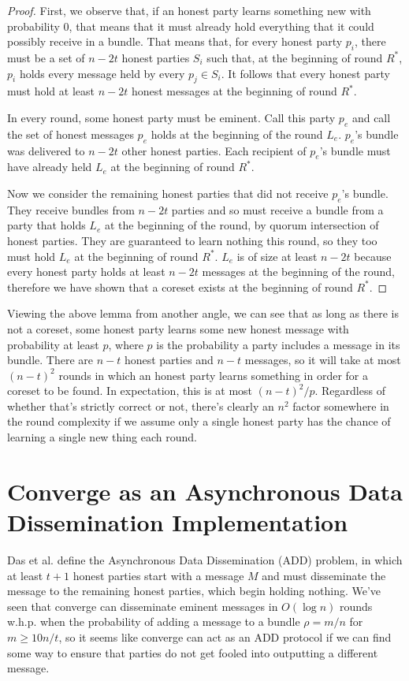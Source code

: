 \documentclass{article}
\begin{document}
\begin{proof}
First, we observe that, if an honest party learns something new with probability 0, that means that it must already hold everything that it could possibly receive in a bundle. That means that, for every honest party $p_i$, there must be a set of $n - 2t$ honest parties $S_i$ such that, at the beginning of round $R^*$, $p_i$ holds every message held by every $p_j \in S_i$. It follows that every honest party must hold at least $n - 2t$ honest messages at the beginning of round $R^*$. 

In every round, some honest party must be eminent. Call this party $p_e$ and call the set of honest messages $p_e$ holds at the beginning of the round $L_e$. $p_e$'s bundle was delivered to $n - 2t$ other honest parties. Each recipient of $p_e$'s bundle must have already held $L_e$ at the beginning of round $R^*$. 

Now we consider the remaining honest parties that did not receive $p_e$'s bundle. They receive bundles from $n - 2t$ parties and so must receive a bundle from a party that holds $L_e$ at the beginning of the round, by quorum intersection of honest parties. They are guaranteed to learn nothing this round, so they too must hold $L_e$ at the beginning of round $R^*$. $L_e$ is of size at least $n - 2t$ because every honest party holds at least $n -2t$ messages at the beginning of the round, therefore we have shown that a coreset exists at the beginning of round $R^*$.
\end{proof}

Viewing the above lemma from another angle, we can see that as long as there is not a coreset, some honest party learns some new honest message with probability at least $p$, where $p$ is the probability a party includes a message in its bundle. There are $n - t$ honest parties and $n - t$ messages, so it will take at most $(n - t)^2$ rounds in which an honest party learns something in order for a coreset to be found. In expectation, this is at most $(n - t)^2 / p$. Regardless of whether that's strictly correct or not, there's clearly an $n^2$ factor somewhere in the round complexity if we assume only a single honest party has the chance of learning a single new thing each round. 

\section{Converge as an Asynchronous Data Dissemination Implementation}
Das et al. \cite{das2021add} define the Asynchronous Data Dissemination (ADD) problem, in which at least $t+1$ honest parties start with a message $M$ and must disseminate the message to the remaining honest parties, which begin holding nothing. We've seen that converge can disseminate eminent messages in $O(\log n)$ rounds w.h.p. when the probability of adding a message to a bundle $\rho = m/n$ for $m \geq 10n/t$, so it seems like converge can act as an ADD protocol if we can find some way to ensure that parties do not get fooled into outputting a different message. 
\end{document}
